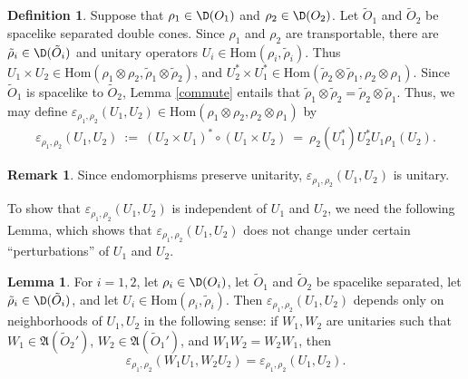 \documentclass[11pt]{article}
\newcommand{\alg}[1]{\mathfrak{#1}}
\theoremstyle{definition}
\newtheorem{lemma}[thm]{Lemma}
\theoremstyle{definition}
\newtheorem{defn}[thm]{Definition}
\newtheorem{note}[thm]{Remark}
\theoremstyle{remark}
\newcommand{\ve}{\varepsilon}
\def\wt#1{{\tilde #1}}
\newcommand{\Hom}{\mathrm{Hom}}
\begin{document}
\begin{defn} Suppose that $\rho _1\in \D (O_1)$ and $\rho _2\in \D (O_2)$.  Let $\wt
  O_1$ and $\wt O_2$ be spacelike separated double cones.  Since $\rho _1$ and $\rho
  _2$ are transportable, there are $\wt \rho _i\in \D (\wt O_i)$ and unitary
  operators $U_i\in \Hom (\rho _i,\wt \rho _i)$.  Thus $U_1\times U_2 \in \Hom (\rho
  _1\otimes \rho _2 ,\wt\rho _1\otimes \wt\rho _2)$, and $U_2^*\times U_1^* \in \Hom
  (\wt\rho _2\otimes \wt\rho _1,\rho _2\otimes \rho _1)$.  Since $\wt O_1$ is
  spacelike to $\wt O_2$, Lemma \ref{commute} entails that $\wt\rho _1\otimes \wt\rho
  _2 =\wt\rho _2\otimes \wt\rho _1$.  Thus, we may define $\ve _{\rho _1,\rho
    _2}(U_1,U_2)\in \Hom (\rho _1\otimes \rho _2 ,\rho _2\otimes \rho _1 )$ by
  \begin{eqnarray}
    \ve _{\rho _1,\rho _2}(U_1,U_2) \: := \: (U_2\times U_1)^* \circ
    (U_1\times U_2) \: =\:  \rho _2 (U_1^*)U_2^*U_1\rho _1(U_2) .\label{def-braiding} \end{eqnarray}\end{defn}

\begin{note} Since endomorphisms preserve unitarity, $\ve _{\rho _1,\rho
    _2}(U_1,U_2)$ is unitary.
\end{note}

To show that $\ve _{\rho _1,\rho _2}(U_1,U_2)$ is independent of $U_1$ and $U_2$, we
need the following Lemma, which shows that $\ve _{\rho _1,\rho _2}(U_1,U_2)$ does not
change under certain ``perturbations'' of $U_1$ and $U_2$.

\begin{lemma} For $i=1,2$, let $\rho _i\in \D (O_i)$, let $\wt O_1$ and $\wt O_2$ be
  spacelike separated, let $\wt\rho _i\in \D (\wt O_i)$, and let $U_i\in \Hom (\rho
  _i,\wt\rho _i)$.  Then $\ve _{\rho _1,\rho _2}(U_1,U_2)$ depends only on
  neighborhoods of $U_1,U_2$ in the following sense: if $W_1,W_2$ are unitaries such
  that $W_1\in \alg{A}(\wt O_2')$, $W_2\in \alg{A}(\wt O_1')$, and $W_1W_2=W_2W_1$,
  then
$$ \ve _{\rho _1,\rho _2}(W_1U_1,W_2U_2)=\ve _{\rho _1,\rho _2}(U_1,U_2) .$$
\label{hunca-munca} \end{lemma}
\end{document}
